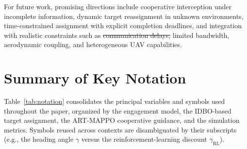\documentclass[lettersize,journal]{IEEEtran}
\newcommand{\hladd}[1]{{\color{blue}#1}}
\newcommand{\hldel}[1]{{\color{red}\sout{#1}}}
\begin{document}
For future work, promising directions include cooperative interception under incomplete
information, dynamic target reassignment in unknown environments, time-constrained assignment
with explicit completion deadlines, and integration with realistic constraints such as
\hldel{communication delays,} limited bandwidth, \hladd{aerodynamic coupling,} and heterogeneous UAV capabilities.










\appendices
\section{\hladd{Summary of Key Notation}}
\label{app:notation}

\hladd{Table~\ref{tab:notation} consolidates the principal variables and symbols used throughout the paper, organized by the engagement model, the IDBO-based target assignment, the ART-MAPPO cooperative guidance, and the simulation metrics. Symbols reused across contexts are disambiguated by their subscripts (e.g., the heading angle $\gamma$ versus the reinforcement-learning discount $\gamma_{\mathrm{RL}}$).}
\end{document}
